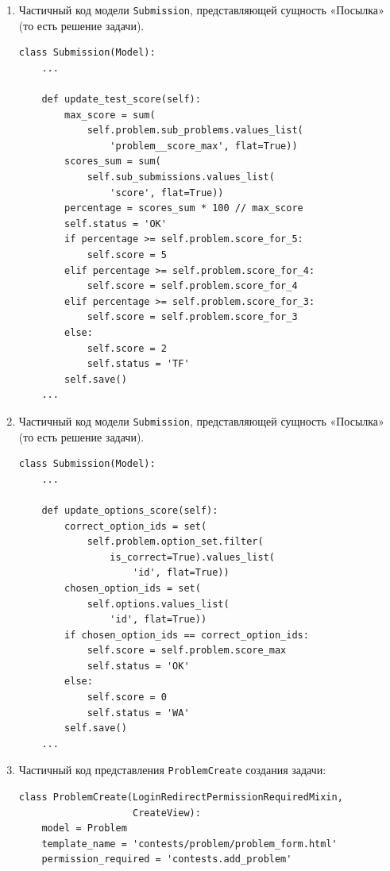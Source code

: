 \documentclass[a4paper]{article}
\begin{document}
\begin{enumerate}[wide, labelindent=0pt]
{\begin{verbatim}
    def save(self, *args, **kwargs):
        created = self._state.adding

        ...

        if (created
                and self.problem.type in ['Program']
                    or not created):
            self.update_assignment()

    \end{verbatim}
}
\item {
    Частичный код модели \texttt{Submission}, представляющей сущность «Посылка» (то есть решение задачи).
    \label{code:update_test_score}
    \begin{verbatim}
class Submission(Model):
    ...

    def update_test_score(self):
        max_score = sum(
            self.problem.sub_problems.values_list(
                'problem__score_max', flat=True))
        scores_sum = sum(
            self.sub_submissions.values_list(
                'score', flat=True))
        percentage = scores_sum * 100 // max_score
        self.status = 'OK'
        if percentage >= self.problem.score_for_5:
            self.score = 5
        elif percentage >= self.problem.score_for_4:
            self.score = self.problem.score_for_4
        elif percentage >= self.problem.score_for_3:
            self.score = self.problem.score_for_3
        else:
            self.score = 2
            self.status = 'TF'
        self.save()
    ...
    \end{verbatim}
}
\item {
    Частичный код модели \texttt{Submission}, представляющей сущность «Посылка» (то есть решение задачи).
    \begin{verbatim}
class Submission(Model):
    ...

    def update_options_score(self):
        correct_option_ids = set(
            self.problem.option_set.filter(
                is_correct=True).values_list(
                    'id', flat=True))
        chosen_option_ids = set(
            self.options.values_list(
                'id', flat=True))
        if chosen_option_ids == correct_option_ids:
            self.score = self.problem.score_max
            self.status = 'OK'
        else:
            self.score = 0
            self.status = 'WA'
        self.save()
    ...
    \end{verbatim}
}
\item {
    Частичный код представления \texttt{ProblemCreate} создания задачи:
    \label{code:problemcreate}
    \begin{verbatim}     
class ProblemCreate(LoginRedirectPermissionRequiredMixin,
                    CreateView):
    model = Problem
    template_name = 'contests/problem/problem_form.html'
    permission_required = 'contests.add_problem'


\end{verbatim}}
\end{enumerate}
\end{document}
